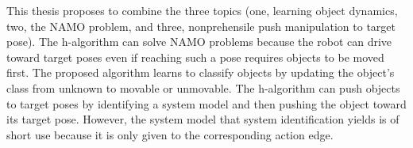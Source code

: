 This thesis proposes to combine the three topics (one, learning object dynamics, two, the \ac{NAMO} problem, and three, nonprehensile push manipulation to target pose). The \ac{h-algorithm} can solve \ac{NAMO} problems because the robot can drive toward target poses even if reaching such a pose requires objects to be moved first. The proposed algorithm learns to classify objects by updating the object's class from unknown to movable or unmovable. The \ac{h-algorithm} can push objects to target poses by identifying a system model and then pushing the object toward its target pose. However, the system model that system identification yields is of short use because it is only given to the corresponding action edge.\bs


